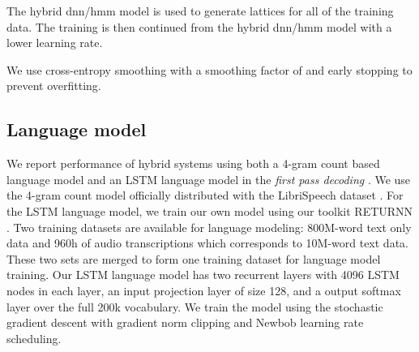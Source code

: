 \documentclass[a4paper]{article}
\begin{document}
The hybrid \ac{dnn}/\ac{hmm} model is used to generate lattices for all of the training data.
The training is then continued from the hybrid \ac{dnn}/\ac{hmm} model with a lower learning rate.

We use cross-entropy smoothing with a smoothing factor of  and early stopping to prevent overfitting.

\subsection{Language model}
\label{sec:lm}
We report performance of hybrid systems using both a 4-gram count based language
model \cite{kneser1995improved} and an LSTM language model \cite{sundermeyer12:lstm} in the \textit{first pass decoding} \cite{beck2019:lstmlm1pass}.
We use the 4-gram count model officially distributed with the LibriSpeech dataset \cite{panayotov2015:librispeech}.
For the LSTM language model, we train our own model using our toolkit RETURNN \cite{zeyer2018:returnn}.
Two training datasets are available for language modeling: 800M-word text only data and
960h of audio transcriptions which corresponds to 10M-word text data. These two sets are merged to form one
training dataset for language model training.
Our LSTM language model has two recurrent layers with 4096 LSTM nodes in each layer, an input projection
layer of size 128, and a output softmax layer over the full 200k vocabulary.
We train the model using the stochastic gradient descent with gradient norm clipping and Newbob
learning rate scheduling.
\end{document}
